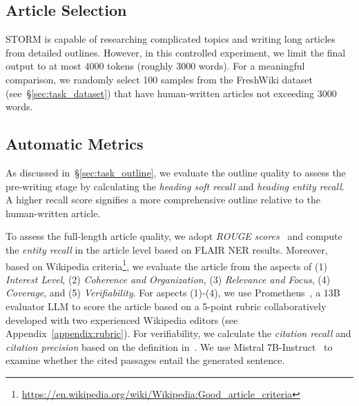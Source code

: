 \documentclass[11pt]{article}
\newcommand{\system}[0]{STORM\xspace}
\newcommand{\refsec}[1]{\S\ref{#1}} %
\begin{document}
\label{sec:exp}
\subsection{Article Selection}
\system is capable of researching complicated topics and writing long articles from detailed outlines. However, in this controlled experiment, we limit the final output to at most 4000 tokens (roughly 3000 words). For a meaningful comparison, we randomly select 100 samples from the FreshWiki dataset (see~\refsec{sec:task_dataset}) that have human-written articles not exceeding 3000 words.%

\subsection{Automatic Metrics}
\label{sec:automatic_metrics}
As discussed in~\refsec{sec:task_outline}, we evaluate the outline quality %
to assess the pre-writing stage by calculating the \textit{heading soft recall} and \textit{heading entity recall}. %
A higher recall score signifies a more comprehensive outline relative to the human-written article.

To assess the full-length article quality, %
we adopt \textit{ROUGE scores}~\citep{lin-2004-rouge} and compute the \textit{entity recall} in the article level based on FLAIR NER results. %
Moreover, based on Wikipedia criteria\footnote{\url{https://en.wikipedia.org/wiki/Wikipedia:Good_article_criteria}}, we evaluate the article from the aspects of (1) \textit{Interest Level}, (2) \textit{Coherence and Organization}, (3) \textit{Relevance and Focus}, (4) \textit{Coverage}, and (5) \textit{Verifiability}. 
For aspects (1)-(4), we use Prometheus~\citep{kim2023prometheus}, a 13B evaluator LLM to score the article based on a 5-point rubric collaboratively developed with two experienced Wikipedia editors (see Appendix~\ref{appendix:rubric}). For verifiability, we calculate the \textit{citation recall} and \textit{citation precision} based on the definition in~\citet{gao-etal-2023-enabling}. We use Mistral 7B-Instruct~\citep{jiang2023mistral} to examine whether the cited passages entail the generated sentence.
\end{document}
